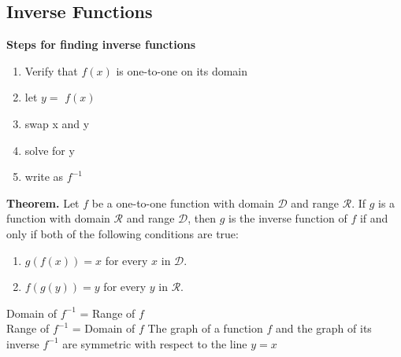 \documentclass{report}
\begin{document}
    \bigbreak \noindent \bigbreak \noindent 
    \subsection{Inverse Functions}

    \bigbreak \noindent 
    \begin{mdframed}
      \textbf{Steps for finding inverse functions}
      \begin{enumerate}
        \item Verify that $f(x)$ is one-to-one on its domain
        \item let $y =$ $f(x)$
        \item swap x and y
        \item solve for y 
        \item write as $f^{-1} $
      \end{enumerate}
    \end{mdframed}

    \bigbreak \noindent 
    \begin{mdframed}
      \textbf{Theorem.}
      \bigbreak \noindent 
      Let $f$ be a one-to-one function with domain $\mathcal{D}$ and range $\mathcal{R}$. If $g$ is a function with domain $\mathcal{R}$ and range $\mathcal{D}$, then $g$ is the inverse function of $f$ if and only if both of the following conditions are true:
      \begin{enumerate}
          \item $g(f(x)) = x$ for every $x$ in $\mathcal{D}$.
          \item $f(g(y)) = y$ for every $y$ in $\mathcal{R}$.
      \end{enumerate}
      \bigbreak \noindent 
      Domain of $f^{-1}$ = Range of $f$ \\
      Range of $f^{-1}$ = Domain of $f$
      \bigbreak \noindent 
      The graph of a function $f$ and the graph of its inverse $f^{-1} $ are symmetric with respect to the line $y=x $
    \end{mdframed}
\end{document}
